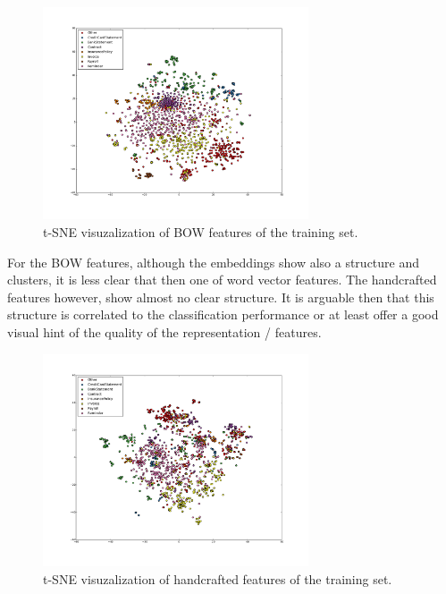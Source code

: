 \begin{figure}[ht!]
	\begin{center}

			\includegraphics[width=0.7\textwidth]{images/tse-tfidf-vectors.png} 

	\end{center}
        \caption{\ac{t-SNE} visuzalization of \ac{BOW} features of the training set.  }

	\label{fig:tsne_viz_2}
\end{figure}
 
For the \ac{BOW} features, although the embeddings show also a  structure
and clusters, it  is less clear that then one of word vector features. The
handcrafted  features however, show almost no clear structure. It is arguable then that this
structure is correlated to the classification performance or at least offer a
good visual hint of the quality of the representation / features. 


\begin{figure}[hptb!]
	\begin{center}

			\includegraphics[width=0.7\textwidth]{images/tse-handcrafted-vectors.pdf} 

	\end{center}
        \caption{\ac{t-SNE} visuzalization of handcrafted features of the training set.}
	\label{fig:tsne_viz_3}
\end{figure}
 

